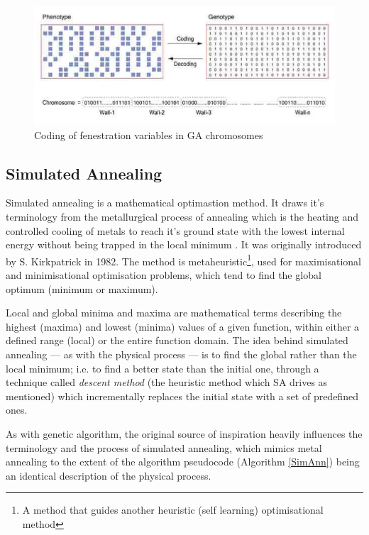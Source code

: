 \begin{figure}
\centering
\includegraphics[width=20cm]{./Chapter3/Images/17-kawakitaChromo}
\caption[Optimisation Model Chromosome Coding]{Coding of fenestration variables in GA chromosomes \cite{kawakita08}}
\label{kawakitaChromo}
\end{figure}

\clearpage
\subsection{Simulated Annealing}

Simulated annealing is a mathematical optimastion method. It draws it's terminology from the metallurgical process of annealing which is the heating and controlled cooling of metals to reach it's ground state with the lowest internal energy without being trapped in the local minimum \cite{lam88}. It was originally introduced by S. Kirkpatrick in 1982. The method is metaheuristic\footnote{A method that guides another heuristic (self learning) optimisational method}, used for maximisational and minimisational optimisation problems, which tend to find the global optimum (minimum or maximum).

Local and global minima and maxima are mathematical terms describing the highest (maxima) and lowest (minima) values of a given function, within either a defined range (local) or the entire function domain. The idea behind simulated annealing --- as with the physical process --- is to find the global rather than the local minimum; i.e. to find a better state than the initial one, through a technique called \emph{descent method} (the heuristic method which SA drives as mentioned)  which incrementally replaces the initial state with a set of predefined ones.

As with genetic algorithm, the original source of inspiration heavily influences the terminology and the process of simulated annealing, which mimics metal annealing to the extent of the algorithm pseudocode (Algorithm \ref{SimAnn}) being an identical description of the physical process.


